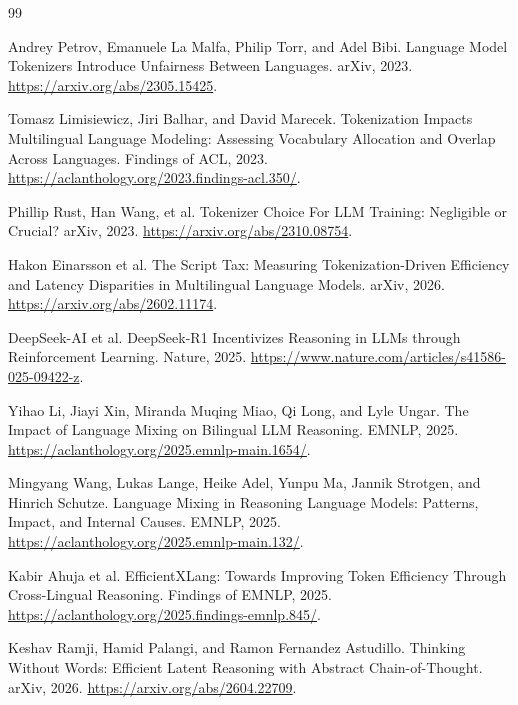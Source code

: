 \documentclass[11pt]{article}
\begin{document}
\FloatBarrier
\begin{thebibliography}{99}

Andrey Petrov, Emanuele La Malfa, Philip Torr, and Adel Bibi.
\newblock Language Model Tokenizers Introduce Unfairness Between Languages.
\newblock arXiv, 2023.
\newblock \url{https://arxiv.org/abs/2305.15425}.

Tomasz Limisiewicz, Jiri Balhar, and David Marecek.
\newblock Tokenization Impacts Multilingual Language Modeling: Assessing Vocabulary Allocation and Overlap Across Languages.
\newblock Findings of ACL, 2023.
\newblock \url{https://aclanthology.org/2023.findings-acl.350/}.

Phillip Rust, Han Wang, et al.
\newblock Tokenizer Choice For LLM Training: Negligible or Crucial?
\newblock arXiv, 2023.
\newblock \url{https://arxiv.org/abs/2310.08754}.

Hakon Einarsson et al.
\newblock The Script Tax: Measuring Tokenization-Driven Efficiency and Latency Disparities in Multilingual Language Models.
\newblock arXiv, 2026.
\newblock \url{https://arxiv.org/abs/2602.11174}.

DeepSeek-AI et al.
\newblock DeepSeek-R1 Incentivizes Reasoning in LLMs through Reinforcement Learning.
\newblock Nature, 2025.
\newblock \url{https://www.nature.com/articles/s41586-025-09422-z}.

Yihao Li, Jiayi Xin, Miranda Muqing Miao, Qi Long, and Lyle Ungar.
\newblock The Impact of Language Mixing on Bilingual LLM Reasoning.
\newblock EMNLP, 2025.
\newblock \url{https://aclanthology.org/2025.emnlp-main.1654/}.

Mingyang Wang, Lukas Lange, Heike Adel, Yunpu Ma, Jannik Strotgen, and Hinrich Schutze.
\newblock Language Mixing in Reasoning Language Models: Patterns, Impact, and Internal Causes.
\newblock EMNLP, 2025.
\newblock \url{https://aclanthology.org/2025.emnlp-main.132/}.

Kabir Ahuja et al.
\newblock EfficientXLang: Towards Improving Token Efficiency Through Cross-Lingual Reasoning.
\newblock Findings of EMNLP, 2025.
\newblock \url{https://aclanthology.org/2025.findings-emnlp.845/}.

Keshav Ramji, Hamid Palangi, and Ramon Fernandez Astudillo.
\newblock Thinking Without Words: Efficient Latent Reasoning with Abstract Chain-of-Thought.
\newblock arXiv, 2026.
\newblock \url{https://arxiv.org/abs/2604.22709}.


\end{thebibliography}
\end{document}
